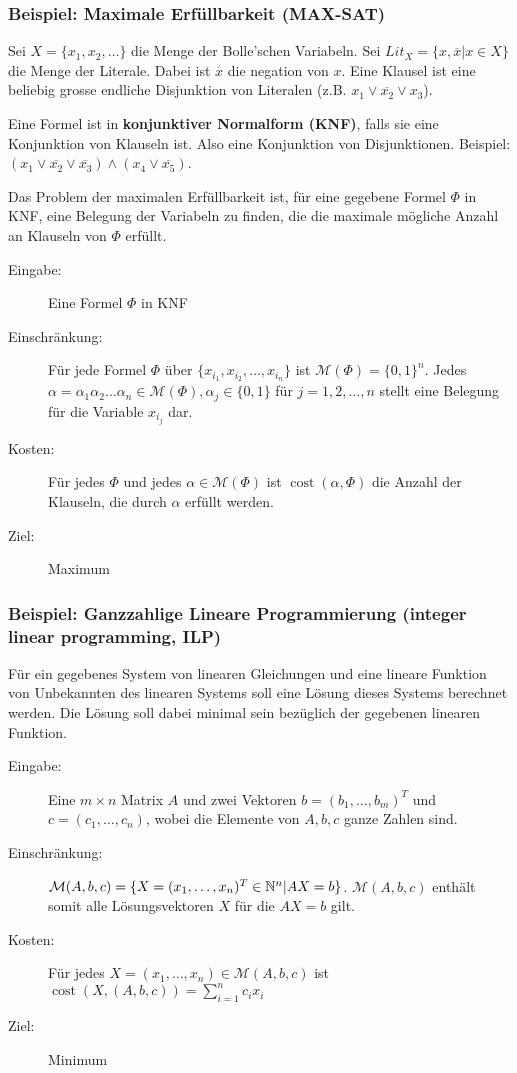 \subsubsection{Beispiel: Maximale Erfüllbarkeit (MAX-SAT)}
Sei $X = \{x_1, x_2, \ldots \}$ die Menge der Bolle'schen Variabeln. Sei $Lit_X = \{x, \overline{x} | x \in X\}$ die Menge der Literale. Dabei ist $\overline{x}$ die negation von $x$. Eine Klausel ist eine beliebig grosse endliche Disjunktion von Literalen (z.B. $x_1 \lor \overline{x_2} \lor x_3$).

Eine Formel ist in \textbf{konjunktiver Normalform (KNF)}, falls sie eine Konjunktion von Klauseln ist. Also eine Konjunktion von Disjunktionen. Beispiel: $(x_1 \lor \overline{x_2} \lor \overline{x_3}) \land (x_4 \lor \overline{x_5})$.

Das Problem der maximalen Erfüllbarkeit ist, für eine gegebene Formel $\Phi$ in KNF, eine Belegung der Variabeln zu finden, die die maximale mögliche Anzahl an Klauseln von $\Phi$ erfüllt.

\begin{description}
  \item[Eingabe:] Eine Formel $\Phi$ in KNF
  \item[Einschränkung:] Für jede Formel $\Phi$ über $\{x_{i_1}, x_{i_2}, \ldots, x_{i_n}\}$ ist $\mathcal{M}(\Phi) = \{0, 1\}^n$. Jedes $\alpha = \alpha_1 \alpha_2 \ldots \alpha_n \in \mathcal{M}(\Phi), \alpha_j \in \{0, 1\}$ für $j = 1, 2, \ldots, n$ stellt eine Belegung für die Variable $x_{i_j}$ dar.
  \item[Kosten:] Für jedes $\Phi$ und jedes $\alpha \in \mathcal{M}(\Phi)$ ist $\operatorname{cost}(\alpha, \Phi)$ die Anzahl der Klauseln, die durch $\alpha$ erfüllt werden.
  \item[Ziel:] Maximum
\end{description}

\subsubsection{Beispiel: Ganzzahlige Lineare Programmierung (integer linear programming, ILP)}
Für ein gegebenes System von linearen Gleichungen und eine lineare Funktion von Unbekannten des linearen Systems soll eine Lösung dieses Systems berechnet werden. Die Lösung soll dabei minimal sein bezüglich der gegebenen linearen Funktion.

\begin{description}
  \item[Eingabe:] Eine $m \times n$ Matrix $A$ und zwei Vektoren $b = (b_1, \ldots, b_m)^T$ und $c = (c_1, \ldots, c_n)$, wobei die Elemente von $A, b, c$ ganze Zahlen sind.
  \item[Einschränkung:] $\mathcal{M}(A, b, c) = \{ X = (x_1, \ldots, x_n)^T \in \mathbb{N}^n | AX = b\}$. $\mathcal{M}(A, b, c)$ enthält somit alle Lösungsvektoren $X$ für die $AX = b$ gilt.
  \item[Kosten:] Für jedes $X = (x_1, \ldots, x_n) \in \mathcal{M}(A, b, c)$ ist $\operatorname{cost}(X, (A, b, c)) = \sum_{i=1}^n c_i x_i$
  \item[Ziel:] Minimum
\end{description}

